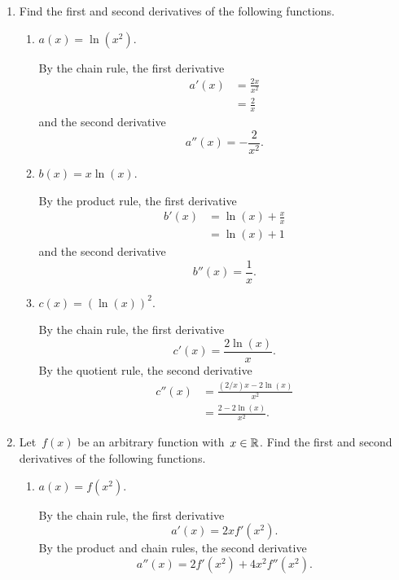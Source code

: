 
\begin{enumerate}

	\item
	Find the first and second derivatives of the following functions.
	\begin{enumerate}

		\item
		$a(x)=\ln(x^2)$.
		\begin{solution}
			By the chain rule, the first derivative
			\begin{align}
				a'(x)
				&= \frac{2x}{x^2}\\
				&= \frac{2}{x}
			\end{align}
			and the second derivative
			\[ a''(x)=-\frac{2}{x^2}. \]
		\end{solution}

		\item
		$b(x)=x\ln(x)$.
		\begin{solution}
			By the product rule, the first derivative
			\begin{align}
				b'(x)
				&= \ln(x)+\frac{x}{x}\\
				&= \ln(x)+1
			\end{align}
			and the second derivative
			\[ b''(x)=\frac{1}{x}. \]
		\end{solution}

		\item
		$c(x)=(\ln(x))^2$.
		\begin{solution}
			By the chain rule, the first derivative
			\[ c'(x)=\frac{2\ln(x)}{x}. \]
			By the quotient rule, the second derivative
			\begin{align}
				c''(x)
				&= \frac{(2/x)x-2\ln(x)}{x^2}\\
				&= \frac{2-2\ln(x)}{x^2}.
			\end{align}
		\end{solution}

	\end{enumerate}

	\item
	Let~$f(x)$ be an arbitrary function with~$x\in\mathbb{R}$.
	Find the first and second derivatives of the following functions.
	\begin{enumerate}

		\item
		$a(x)=f(x^2)$.
		\begin{solution}
			By the chain rule, the first derivative
			\[ a'(x)=2xf'(x^2). \]
			By the product and chain rules, the second derivative
			\[ a''(x)=2f'(x^2)+4x^2f''(x^2). \]
		\end{solution}


\end{enumerate}
\end{enumerate}
